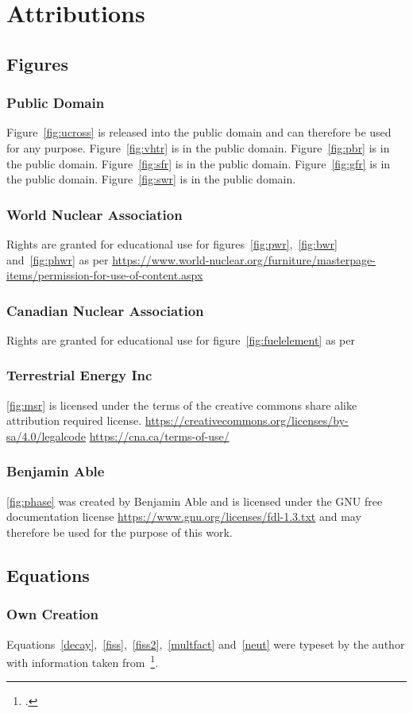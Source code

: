 \chapter{Attributions}
\section{Figures}
\subsection{Public Domain}
Figure~\ref{fig:ucross} is released into the public domain and can therefore be used for any purpose.
Figure~\ref{fig:vhtr} is in the public domain.
Figure~\ref{fig:pbr} is in the public domain.
Figure~\ref{fig:sfr} is in the public domain.
Figure~\ref{fig:gfr} is in the public domain.
Figure~\ref{fig:swr} is in the public domain.
\subsection{World Nuclear Association}
Rights are granted for educational use for figures~\ref{fig:pwr},~\ref{fig:bwr} and~\ref{fig:phwr}
as per \url{https://www.world-nuclear.org/furniture/masterpage-items/permission-for-use-of-content.aspx}
\subsection{Canadian Nuclear Association}
Rights are granted for educational use for figure~\ref{fig:fuelelement} as per
\subsection{Terrestrial Energy Inc}
\ref{fig:msr} is licensed under the terms of the creative commons share alike attribution required
license. \url{https://creativecommons.org/licenses/by-sa/4.0/legalcode}
\url{https://cna.ca/terms-of-use/}
\subsection{Benjamin Able}
\ref{fig:phase} was created by Benjamin Able and is licensed under the GNU free documentation license
\url{https://www.gnu.org/licenses/fdl-1.3.txt} and may therefore be used for the purpose of this
work.
\section{Equations}
\subsection{Own Creation}
Equations~\ref{decay},~\ref{fiss},~\ref{fiss2},~\ref{multfact} and~\ref{neut} were typeset by the author with
information taken from~\footcite{ReactorDesign}.

